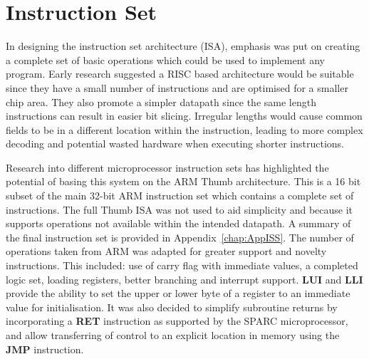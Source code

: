 
\chapter{Instruction Set}\label{ch:is}

In designing the instruction set architecture (ISA), emphasis was put on creating a complete set of basic operations which could be used to implement any program. 
Early research suggested a RISC based architecture would be suitable since they have a small number of instructions and are optimised for a smaller chip area. 
They also promote a simpler datapath since the same length instructions can result in easier bit slicing. 
Irregular lengths would cause common fields to be in a different location within the instruction, leading to more complex decoding and potential wasted hardware when executing shorter instructions. 

Research into different microprocessor instruction sets has highlighted the potential of basing this system on the ARM Thumb architecture.
This is a 16 bit subset of the main 32-bit ARM instruction set which contains a complete set of instructions. 
The full Thumb ISA was not used to aid simplicity and because it supports operations not available within the intended datapath. 
A summary of the final instruction set is provided in Appendix~\ref{chap:AppISS}. 
The number of operations taken from ARM was adapted for greater support and novelty instructions.
This included: use of carry flag with immediate values, a completed logic set, loading registers, better branching and interrupt support. 
\textbf{LUI} and \textbf{LLI} provide the ability to set the upper or lower byte of a register to an immediate value for initialisation. 
It was also decided to simplify subroutine returns by incorporating a \textbf{RET} instruction as supported by the SPARC microprocessor, and allow transferring of control to an explicit location in memory using the \textbf{JMP} instruction.

